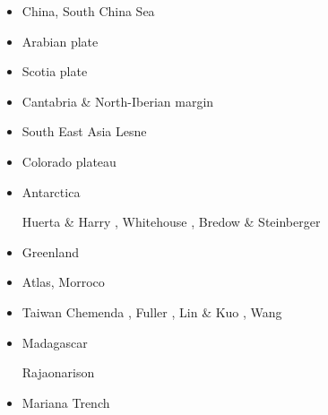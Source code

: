 \begin{itemize}
\item China, South China Sea
{\scriptsize
\cite{zhst10}
\cite{wazh15}
\cite{guyr16}
\cite{lixs19}
\cite{dawl20}
}
\item Arabian plate 
{\scriptsize
\cite{rerl15}
}
\item Scotia plate 
{\scriptsize
\cite{necb13}
\cite{vaga20}
}
\item Cantabria \& North-Iberian margin 
{\scriptsize
\cite{clbb02}
\cite{peap15}
}
\item South East Asia 
{\scriptsize
Lesne \etal \cite{lecd00}\\
\cite{rekv04}
\cite{yotr15}\cite{hasp15}\cite{meds15}
\cite{necg16}
}
\item Colorado plateau 
{\scriptsize
\cite{vabv10}
\cite{lesm11}
}
\item Antarctica  

\begin{scriptsize}
Huerta \& Harry \cite{huha07},
Whitehouse \etal \cite{whbl12},
Bredow \& Steinberger \cite{brst21}
\end{scriptsize}

\item Greenland  
{\scriptsize
\cite{stsj15}\cite{heps15}\cite{stbl19}
}
\item Atlas, Morroco  
{\scriptsize
\cite{mica12}
\cite{kava14}
}
\item Taiwan  
{\scriptsize
Chemenda \etal \cite{chys01}, Fuller \etal \cite{fuwf06}, Lin \& Kuo \cite{liku16},
Wang \etal \cite{wakz19}
}
\item Madagascar 
\begin{scriptsize}
\twothousandtwenty Rajaonarison \etal \cite{rasf20} 
\end{scriptsize}

\item Mariana Trench  
{\scriptsize
\cite{zhlb15}
}


\end{itemize}
